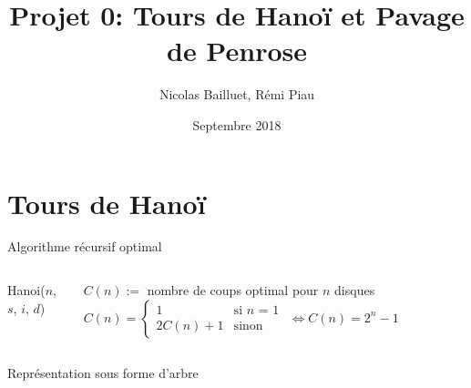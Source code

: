 \documentclass[usenames,dvipsnames,serif,14pt]{beamer}%
\author{Nicolas Bailluet, Rémi Piau}
\title{Projet 0: Tours de Hanoï et Pavage de Penrose}
\institute{L3, ENS Rennes}
\date{Septembre 2018}
\begin{document}
\beamertemplatenavigationsymbolsempty

\begin{frame}
\titlepage
\end{frame}

\section{Tours de Hanoï}

\begin{frame}{Algorithme récursif optimal}
  \begin{columns}[shrink=20]
    \begin{column}{.58\textwidth}
      \begin{algorithm}[H]
      \caption{Hanoi($n$, $s$, $i$, $d$)}
      \end{algorithm}
    \end{column}
    \hfill
    \begin{column}{.48\textwidth}
      $C(n):=$ nombre de coups optimal pour $n$ disques
      \newline
      \newline
      $C(n) =
      \begin{cases}
        1 & \mbox{si $n$ = 1}\\
        2C(n)+1 & \mbox{sinon}
      \end{cases}
      $
      \newline
      \newline
      \newline
      $\Leftrightarrow \boxed{C(n) = 2^{n}-1}$
    \end{column}
  \end{columns}
\end{frame}

\begin{frame}{Représentation sous forme d'arbre}
\end{frame}
\end{document}
